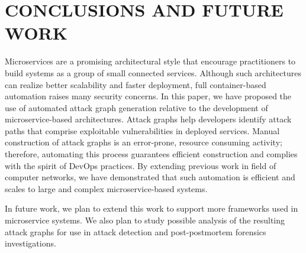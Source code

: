 \section{CONCLUSIONS AND FUTURE WORK}
\label{chap:conclusion}

Microservices are a promising architectural style that encourage practitioners to build systems as a group of small connected  services. Although such architectures can realize better scalability and faster deployment, full container-based automation raises many security concerns. In this paper, we have proposed the use of automated attack graph generation relative to the development of microservice-based architectures. Attack graphs help developers identify attack paths that comprise exploitable vulnerabilities in deployed services. Manual construction of attack graphs is an error-prone, resource consuming activity; therefore, automating this process guarantees efficient construction and complies with the spirit of DevOps practices. By extending previous work in field of computer networks, we have demonstrated that such automation is efficient and scales to large and complex microservice-based systems. 

In future work, we plan to extend this work to support more frameworks used in microservice systems. We also plan to study possible analysis of the resulting attack graphs for use in attack detection and post-postmortem forensics investigations. 